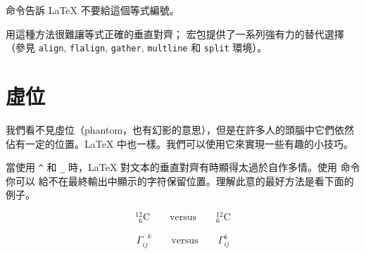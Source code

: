 %

\noindent{} 命令告訴 \LaTeX{} 不要給這個等式編號。

用這種方法很難讓等式正確的垂直對齊； 宏包提供了一系列強有力的替代選擇（參見 
\verb|align|, \verb|flalign|, \verb|gather|,
\verb|multline| 和 \verb|split| 環境）。


\section{虛位}

%
我們看不見虛位（phantom，也有幻影的意思），但是在許多人的頭腦中它們依然佔有一定的位置。\LaTeX{} 中也一樣。我們可以使用它來實現一些有趣的小技巧。

當使用 \verb|^| 和 \verb|_| 時，\LaTeX{} 對文本的垂直對齊有時顯得太過於自作多情。使用  命令你可以
給不在最終輸出中顯示的字符保留位置。理解此意的最好方法是看下面的例子。
\begin{example}
\begin{displaymath}
{}^{12}_{\phantom{1}6}\textrm{C}
\qquad \textrm{versus} \qquad
{}^{12}_{6}\textrm{C}
\end{displaymath}
\end{example}
\begin{example}
\begin{displaymath}
\Gamma_{ij}^{\phantom{ij}k}
\qquad \textrm{versus} \qquad
\Gamma_{ij}^{k}
\end{displaymath}
\end{example}


